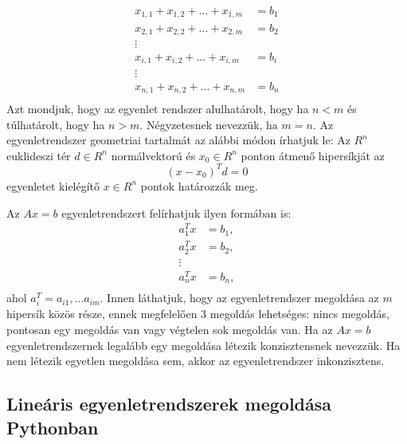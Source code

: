 \begin{align*}
x_{1,1} + x_{1,2} + \dots + x_{1,m} &= b_{1}\\
x_{2,1} + x_{2,2} + \dots + x_{2,m} &= b_{2}\\
\vdots\\
x_{i,1} + x_{i,2} + \dots + x_{i,m} &= b_{i}\\
\vdots\\
x_{n,1} + x_{n,2} + \dots + x_{n,m} &= b_{n}\\
\end{align*}
Azt mondjuk, hogy az egyenlet rendszer alulhatárolt, hogy ha \(n < m\) és
túlhatárolt, hogy ha \(n>m\). Négyzetesnek nevezzük, ha \(m = n\). Az
egyenletrendszer geometriai tartalmát az alábbi módon írhatjuk le:
    Az \(R^n\) euklideszi tér \(d\in R^n\) normálvektorú és \(x_0 \in R^n\)
ponton átmenő hipersíkját az
\[
(x - x_0)^Td=0
\]
egyenletet kielégítő \(x \in R^n\) pontok határozzák meg.

Az \(Ax=b\) egyenletrendszert felírhatjuk ilyen formában is:
\begin{align*} 
a_{1}^Tx &= b_1,\\
a_{2}^Tx &= b_2,\\
\vdots\\
a_{n}^Tx &= b_n,\\
\end{align*}
ahol \(a_{i}^T={a_{i1}, \dots a_{im}}\).
Innen láthatjuk, hogy az egyenletrendszer megoldása az \(m\) hipersík
közös része, ennek megfelelően 3 megoldás lehetséges: nincs megoldás, pontosan egy megoldás van vagy végtelen sok megoldás van.
Ha az \(Ax=b\) egyenletrendszernek legalább egy megoldása létezik
konzisztensnek nevezzük. Ha nem létezik egyetlen megoldása sem, akkor az
egyenletrendszer inkonzisztens.

\subsection{Lineáris egyenletrendszerek megoldása Pythonban}

